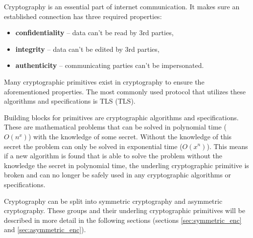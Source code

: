 
Cryptography is an essential part of internet communication. It makes sure an established connection has three required properties\cite{Bernstein149}:
\begin{itemize}
  \item \textbf{confidentiality} -- data can't be read by 3rd parties,
  \item \textbf{integrity} -- data can't be edited by 3rd parties,
  \item \textbf{authenticity} -- communicating parties can't be impersonated.
\end{itemize}
Many cryptographic primitives exist in cryptography to ensure the aforementioned properties. The most commonly used protocol that utilizes these algorithms and specifications is TLS (\acl{TLS}).

Building blocks for primitives are cryptographic algorithms and specifications. These are mathematical problems that can be solved in polynomial time ($O(n^x)$) with the knowledge of some secret. Without the knowledge of this secret the problem can only be solved in exponential time ($O(x^n)$). This means if a new algorithm is found that is able to solve the problem without the knowledge the secret in polynomial time, the underling cryptographic primitive is broken and can no longer be safely used in any cryptographic algorithms or specifications.\cite{Smart2004}

Cryptography can be split into symmetric cryptography and asymmetric cryptography. These groups and their underling cryptographic primitives will be described in more detail in the following sections (sections \ref{sec:symmetric_enc} and \ref{sec:asymmetric_enc}).


